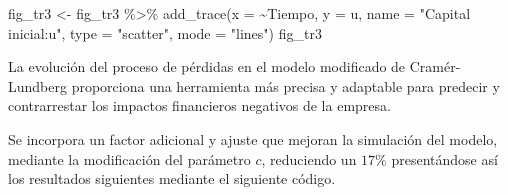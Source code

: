 \documentclass[
  us-letterpaper,
]{scrreprt}
\newenvironment{Shaded}{\begin{snugshade}}{\end{snugshade}}
\newcommand{\AttributeTok}[1]{\textcolor[rgb]{0.40,0.45,0.13}{#1}}
\newcommand{\FunctionTok}[1]{\textcolor[rgb]{0.28,0.35,0.67}{#1}}
\newcommand{\NormalTok}[1]{\textcolor[rgb]{0.00,0.23,0.31}{#1}}
\newcommand{\OtherTok}[1]{\textcolor[rgb]{0.00,0.23,0.31}{#1}}
\newcommand{\SpecialCharTok}[1]{\textcolor[rgb]{0.37,0.37,0.37}{#1}}
\newcommand{\StringTok}[1]{\textcolor[rgb]{0.13,0.47,0.30}{#1}}
\theoremstyle{definition}
\theoremstyle{plain}
\theoremstyle{plain}
\theoremstyle{remark}
\begin{document}
\begin{Shaded}
\begin{Highlighting}[]
\NormalTok{fig\_tr3 }\OtherTok{\textless{}{-}}\NormalTok{ fig\_tr3 }\SpecialCharTok{\%\textgreater{}\%} \FunctionTok{add\_trace}\NormalTok{(}\AttributeTok{x =} \SpecialCharTok{\textasciitilde{}}\NormalTok{Tiempo, }\AttributeTok{y =}\NormalTok{ u,}
           \AttributeTok{name =} \StringTok{"Capital inicial:u"}\NormalTok{, }
           \AttributeTok{type =} \StringTok{"scatter"}\NormalTok{, }\AttributeTok{mode =} \StringTok{"lines"}\NormalTok{)}
\NormalTok{fig\_tr3}
\end{Highlighting}
\end{Shaded}

\begin{figure}


\caption{\label{fig-fig-trayectoria3pdf}}

\end{figure}%

La evolución del proceso de pérdidas en el modelo modificado de
Cramér-Lundberg proporciona una herramienta más precisa y adaptable para
predecir y contrarrestar los impactos financieros negativos de la
empresa.

Se incorpora un factor adicional y ajuste que mejoran la simulación del
modelo, mediante la modificación del parámetro \(c\), reduciendo un
\(17\%\) presentándose así los resultados siguientes mediante el
siguiente código.
\end{document}
